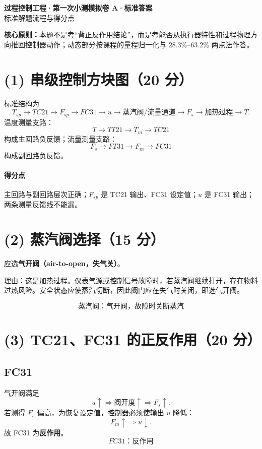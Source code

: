 \documentclass[UTF8,a4paper,11pt]{ctexart}
\begin{document}
\begin{center}
{\LARGE\bfseries 过程控制工程·第一次小测模拟卷 A·标准答案}\\[4pt]
{\large 标准解题流程与得分点}
\end{center}
\noindent\colorbox{soft}{\parbox{0.94\linewidth}{\textbf{核心原则：}本题不是考“背正反作用结论”，而是考能否从执行器特性和过程物理方向推回控制器动作；动态部分按课程的量程归一化与 $28.3\%$--$63.2\%$ 两点法作答。}}

\section*{(1) 串级控制方块图（20 分）}
标准结构为
\[
T_{sp}\rightarrow \boxed{TC21}\rightarrow F_{sp}
\rightarrow \boxed{FC31}\rightarrow u
\rightarrow \boxed{蒸汽阀/流量通道}\rightarrow F_s
\rightarrow \boxed{加热过程}\rightarrow T.
\]
温度测量支路：
\[
T\rightarrow \boxed{TT21}\rightarrow T_m\rightarrow TC21
\]
构成主回路负反馈；流量测量支路：
\[
F_s\rightarrow \boxed{FT31}\rightarrow F_m\rightarrow FC31
\]
构成副回路负反馈。

\paragraph{得分点}
主回路与副回路层次正确；$F_{sp}$ 是 TC21 输出、FC31 设定值；$u$ 是 FC31 输出；两条测量反馈线不能漏。

\section*{(2) 蒸汽阀选择（15 分）}
应选\textbf{气开阀（air-to-open，失气关）}。

理由：这是加热过程。仪表气源或控制信号故障时，若蒸汽阀继续打开，存在物料过热风险。安全状态应使蒸汽切断，因此阀门应在失气时关闭，即选气开阀。

\[
\boxed{\text{蒸汽阀：气开阀，故障时关断蒸汽}}
\]

\section*{(3) TC21、FC31 的正反作用（20 分）}
\subsection*{FC31}
气开阀满足
\[
u\uparrow\Rightarrow \text{阀开度}\uparrow\Rightarrow F_s\uparrow.
\]
若测得 $F_s$ 偏高，为恢复设定值，控制器必须使输出 $u$ 降低：
\[
F_m\uparrow\Rightarrow u\downarrow.
\]
故 FC31 为\textbf{反作用}。
\[
\boxed{FC31：反作用}
\]
\end{document}
